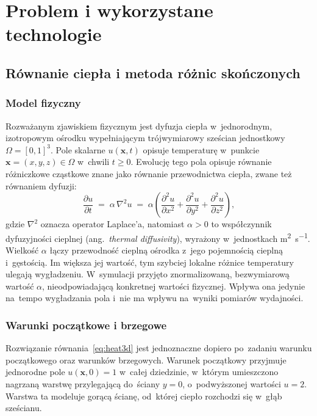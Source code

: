 \chapter{Problem i wykorzystane technologie}
\label{ch:problem}

\section{Równanie ciepła i metoda różnic skończonych}
\label{sec:heat-fdm}

\subsection{Model fizyczny}

Rozważanym zjawiskiem fizycznym jest dyfuzja ciepła w~jednorodnym, izotropowym
ośrodku wypełniającym trójwymiarowy sześcian jednostkowy \(\Omega = [0,1]^3\). Pole skalarne
\(u(\mathbf{x},t)\) opisuje temperaturę w~punkcie \(\mathbf{x}=(x,y,z)\in\Omega\)
w~chwili \(t\ge 0\). Ewolucję tego pola opisuje równanie różniczkowe
cząstkowe znane jako równanie przewodnictwa ciepła, zwane też równaniem dyfuzji:
\begin{equation}
  \frac{\partial u}{\partial t} \;=\; \alpha\,\nabla^2 u
  \;=\; \alpha\!\left(
    \frac{\partial^2 u}{\partial x^2}
    + \frac{\partial^2 u}{\partial y^2}
    + \frac{\partial^2 u}{\partial z^2}
  \right),
  \label{eq:heat3d}
\end{equation}
gdzie \(\nabla^2\) oznacza operator Laplace'a, natomiast
\(\alpha>0\) to współczynnik dyfuzyjności cieplnej (ang.\ \emph{thermal
diffusivity}), wyrażony w~jednostkach \si{\metre\squared\per\second}. Wielkość
\(\alpha\) łączy przewodność cieplną ośrodka z~jego pojemnością cieplną i~gęstością.
Im większa jej wartość, tym szybciej lokalne różnice temperatury ulegają
wygładzeniu. W~symulacji przyjęto znormalizowaną, bezwymiarową wartość \(\alpha\),
nieodpowiadającą konkretnej wartości fizycznej. Wpływa ona jedynie na~tempo
wygładzania pola i~nie ma wpływu na~wyniki pomiarów wydajności.

\subsection{Warunki początkowe i brzegowe}

Rozwiązanie równania~\eqref{eq:heat3d} jest jednoznaczne dopiero po~zadaniu
warunku początkowego oraz warunków brzegowych. Warunek początkowy
przyjmuje jednorodne pole \(u(\mathbf{x},0)=1\) w~całej
dziedzinie, w~którym umieszczono nagrzaną warstwę przylegającą do~ściany
\(y=0\), o~podwyższonej wartości \(u=2\). Warstwa ta modeluje gorącą ścianę,
od~której ciepło rozchodzi się w~głąb sześcianu.


